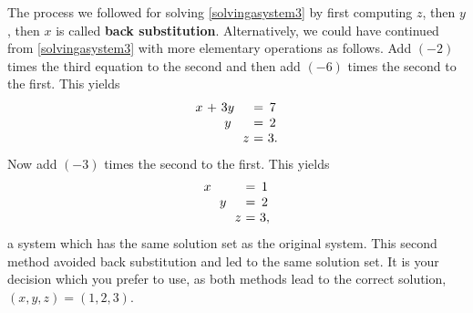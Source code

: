 \begin{solution}
  The process we followed for solving \eqref{solvingasystem3} by first
  computing $z$, then $y$, then $x$ is called \textbf{back
    substitution}.  Alternatively, we could
  have continued from \eqref{solvingasystem3} with more elementary
  operations as follows. Add $\left( -2\right) $ times the third
  equation to the second and then add $\left( -6\right) $ times the
  second to the first. This yields
  \begin{equation*}
    \allowbreak
    \begin{array}{c@{~}c@{~}c@{~}c@{~}c@{~}c@{~}c}
      x&+&3y&&&=&7 \\
      &&y&&&=&2 \\
      &&&&z&=&3.
    \end{array}
  \end{equation*}
  Now add $\left( -3\right) $ times the second to the first. This yields
  \begin{equation*}
    \allowbreak
    \begin{array}{c@{~}c@{~}c@{~}c@{~}c@{~}c@{~}c}
      x&&&&&=&1 \\
      &&y&&&=&2 \\
      &&&&z&=&3,
    \end{array}
  \end{equation*}
  a system which has the same solution set as the original
  system. This second method avoided back substitution and led to the
  same solution set. It is your decision which you prefer to use, as
  both methods lead to the correct solution,
  $\left( x,y,z \right) = \left(1,2,3\right)$.
\end{solution}

